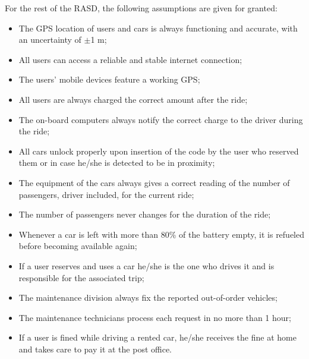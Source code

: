 For the rest of the RASD, the following assumptions are given for granted:

\begin{itemize}
\item The GPS location of users and cars is always functioning and accurate, with an uncertainty of $\pm$1 m; 
\item All users can access a reliable and stable internet connection;
\item The users' mobile devices feature a working GPS;
\item All users are always charged the correct amount after the ride;
\item The on-board computers always notify the correct charge to the driver during the ride;
\item All cars unlock properly upon insertion of the code by the user who reserved them or in case he/she is detected to be in proximity;
\item The equipment of the cars always gives a correct reading of the number of passengers, driver included, for the current ride;
\item The number of passengers never changes for the duration of the ride;
\item Whenever a car is left with more than 80\% of the battery empty, it is refueled before becoming available again;
\item If a user reserves and uses a car he/she is the one who drives it and is responsible for the associated trip;
\item The maintenance division always fix the reported out-of-order vehicles;
\item The maintenance technicians process each request in no more than 1 hour;
\item If a user is fined while driving a rented car, he/she receives the fine at home and takes care to pay it at the post office.
\end{itemize}